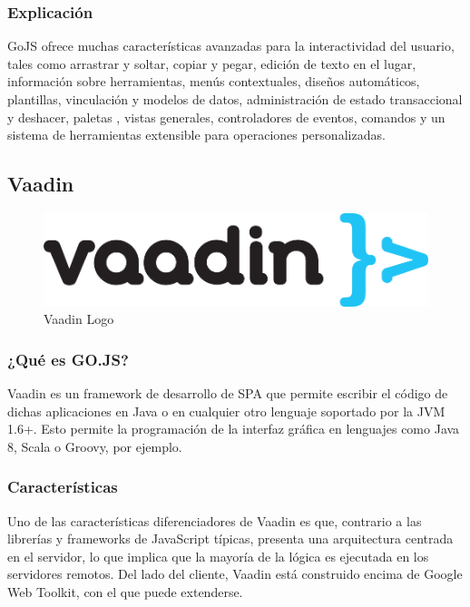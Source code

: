 \documentclass[a4paper,12pt]{article}
\begin{document}
	 	
	 		\subsubsection{Explicación}
	 		GoJS ofrece muchas características avanzadas para la interactividad del usuario, tales como arrastrar y soltar, copiar y pegar, edición de texto en el lugar, información sobre herramientas, menús contextuales, diseños automáticos, plantillas, vinculación y modelos de datos, administración de estado transaccional y deshacer, paletas , vistas generales, controladores de eventos, comandos y un sistema de herramientas extensible para operaciones personalizadas.
	 
	 
	 	\subsection{Vaadin}
	 	
	 		\begin{figure}[h]
	 			\centering
	 			\includegraphics[scale=1]{Vaadin-logo.png}
	 			\caption{Vaadin Logo}\label{fig:Vaadin-logo}
	 		\end{figure}
 		
 			\subsubsection{¿Qué es GO.JS?}
 				Vaadin\cite{vaadin} es un framework de desarrollo de SPA que permite escribir el código de dichas aplicaciones en Java o en cualquier otro lenguaje soportado por la JVM 1.6+. Esto permite la programación de la interfaz gráfica en lenguajes como Java 8, Scala o Groovy, por ejemplo.
 			
 			\subsubsection{Características}
 				Uno de las características diferenciadores de Vaadin es que, contrario a las librerías y frameworks de JavaScript típicas, presenta una arquitectura centrada en el servidor, lo que implica que la mayoría de la lógica es ejecutada en los servidores remotos. Del lado del cliente, Vaadin está construido encima de Google Web Toolkit, con el que puede extenderse.
 	
\end{document}

